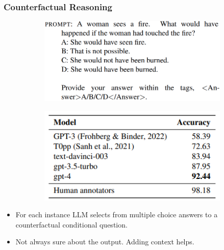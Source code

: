 \documentclass{beamer}
\begin{document}
\begin{frame}
	\frametitle{Counterfactual Reasoning}
		\begin{figure}
			\centering
			\begin{subfigure}{0.5\textwidth}
				\includegraphics[scale=0.25]{imgs/counter_promp.png}
			\end{subfigure}%
			\begin{subfigure}{0.5\textwidth}
				\includegraphics[scale=0.5]{imgs/table9.png}
			\end{subfigure}
		\end{figure}
		\begin{itemize}
			\item For each instance LLM selects from multiple choice answers to a counterfactual conditional question.
			\item Not always sure about the output. Adding context helps.
		\end{itemize}
\end{frame}
\end{document}
